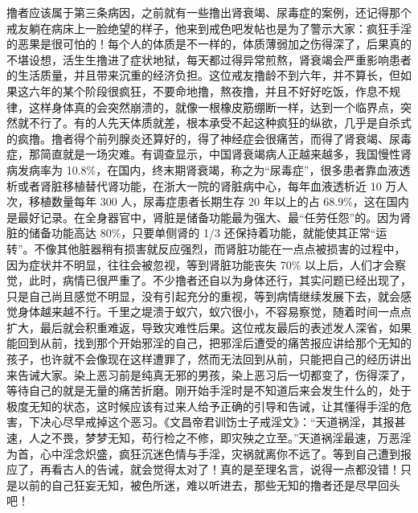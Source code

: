 \begin{case}
\begin{description}
    \end{description} 撸者应该属于第三条病因，之前就有一些撸出肾衰竭、尿毒症的案例，还记得那个戒友躺在病床上一脸绝望的样子，他来到戒色吧发帖也是为了警示大家：疯狂手淫的恶果是很可怕的！每个人的体质是不一样的，体质薄弱加之伤得深了，后果真的不堪设想，活生生撸进了症状地狱，每天都过得异常煎熬，肾衰竭会严重影响患者的生活质量，并且带来沉重的经济负担。这位戒友撸龄不到六年，并不算长，但如果这六年的某个阶段很疯狂，不要命地撸，熬夜撸，并且不好好吃饭，作息不规律，这样身体真的会突然崩溃的，就像一根橡皮筋绷断一样，达到一个临界点，突然就不行了。有的人先天体质就差，根本承受不起这种疯狂的纵欲，几乎是自杀式的疯撸。撸者得个前列腺炎还算好的，得了神经症会很痛苦，而得了肾衰竭、尿毒症，那简直就是一场灾难。有调查显示，中国肾衰竭病人正越来越多，我国慢性肾病发病率为 10.8\%，在国内，终末期肾衰竭，称之为“尿毒症”，很多患者靠血液透析或者肾脏移植替代肾功能，在浙大一院的肾脏病中心，每年血液透析近 10 万人次，移植数量每年 300 人，尿毒症患者长期生存 20 年以上的占 68.9\%，这在国内是最好记录。在全身器官中，肾脏是储备功能最为强大、最“任劳任怨”的。因为肾脏的储备功能高达 80\%，只要单侧肾的 1/3 还保持着功能，就能使其正常“运转”。不像其他脏器稍有损害就反应强烈，而肾脏功能在一点点被损害的过程中，因为症状并不明显，往往会被忽视，等到肾脏功能丧失 70\% 以上后，人们才会察觉，此时，病情已很严重了。不少撸者还自以为身体还行，其实问题已经出现了，只是自己尚且感觉不明显，没有引起充分的重视，等到病情继续发展下去，就会感觉身体越来越不行。千里之堤溃于蚁穴，蚁穴很小，不容易察觉，随着时间一点点扩大，最后就会积重难返，导致灾难性后果。这位戒友最后的表述发人深省，如果能回到从前，找到那个开始邪淫的自己，把邪淫后遭受的痛苦报应讲给那个无知的孩子，也许就不会像现在这样遭罪了，然而无法回到从前，只能把自己的经历讲出来告诫大家。染上恶习前是纯真无邪的男孩，染上恶习后一切都变了，伤得深了，等待自己的就是无量的痛苦折磨。刚开始手淫时是不知道后来会发生什么的，处于极度无知的状态，这时候应该有过来人给予正确的引导和告诫，让其懂得手淫的危害，下决心尽早戒掉这个恶习。《文昌帝君训饬士子戒淫文》：“天道祸淫，其报甚速，人之不畏，梦梦无知，苟行检之不修，即灾殃之立至。”天道祸淫最速，万恶淫为首，心中淫念炽盛，疯狂沉迷色情与手淫，灾祸就离你不远了。等到自己遭到报应了，再看古人的告诫，就会觉得太对了！真的是至理名言，说得一点都没错！只是以前的自己狂妄无知，被色所迷，难以听进去，那些无知的撸者还是尽早回头吧！
\end{case}

